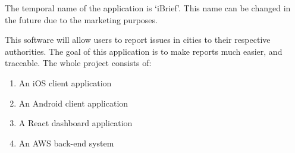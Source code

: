 The temporal name of the application is `iBrief'. This name can be changed in the future due to the marketing purposes.

This software will allow users to report issues in cities to their respective authorities. The goal of this application is to make reports much easier, and traceable. The whole project consists of:

\begin{enumerate}
    \item An \gls{iOS} \gls{client application}
    \item An \gls{Android} \gls{client application}
    \item A \gls{React} \gls{dashboard application}
    \item An \gls{AWS} \gls{back-end} system
\end{enumerate}